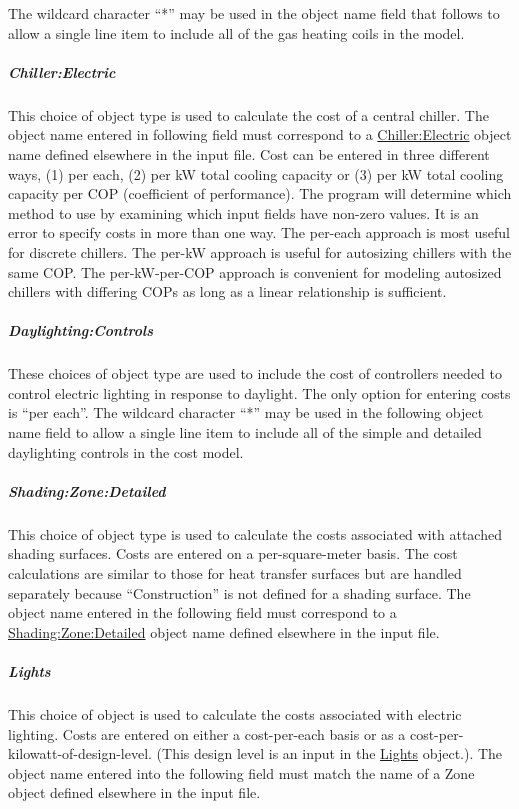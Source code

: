 The wildcard character ``*'' may be used in the object name field that follows to allow a single line item to include all of the gas heating coils in the model.

\subparagraph{Chiller:Electric}\label{chiller-electric-costlineitem}

This choice of object type is used to calculate the cost of a central chiller. The object name entered in following field must correspond to a \hyperref[chillerelectric]{Chiller:Electric} object name defined elsewhere in the input file. Cost can be entered in three different ways, (1) per each, (2) per kW total cooling capacity or (3) per kW total cooling capacity per COP (coefficient of performance). The program will determine which method to use by examining which input fields have non-zero values. It is an error to specify costs in more than one way. The per-each approach is most useful for discrete chillers. The per-kW approach is useful for autosizing chillers with the same COP. The per-kW-per-COP approach is convenient for modeling autosized chillers with differing COPs as long as a linear relationship is sufficient.
\subparagraph{Daylighting:Controls}\label{daylightingcontrols}

These choices of object type are used to include the cost of controllers needed to control electric lighting in response to daylight. The only option for entering costs is ``per each''. The wildcard character ``*'' may be used in the following object name field to allow a single line item to include all of the simple and detailed daylighting controls in the cost model.

\subparagraph{Shading:Zone:Detailed}\label{shadingzonedetailed}

This choice of object type is used to calculate the costs associated with attached shading surfaces. Costs are entered on a per-square-meter basis. The cost calculations are similar to those for heat transfer surfaces but are handled separately because ``Construction'' is not defined for a shading surface. The object name entered in the following field must correspond to a \hyperref[shadingzonedetailed-000]{Shading:Zone:Detailed} object name defined elsewhere in the input file.

\subparagraph{Lights}\label{lights}

This choice of object is used to calculate the costs associated with electric lighting. Costs are entered on either a cost-per-each basis or as a cost-per-kilowatt-of-design-level. (This design level is an input in the \hyperref[lights-000]{Lights} object.). The object name entered into the following field must match the name of a Zone object defined elsewhere in the input file.

